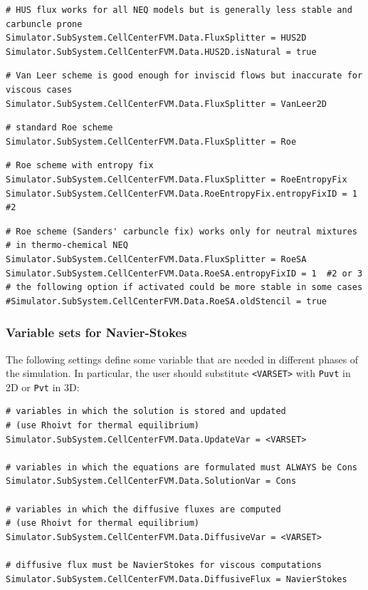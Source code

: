 \documentclass[11pt]{article}
\begin{document}
\begin{lstlisting}[breaklines]
# HUS flux works for all NEQ models but is generally less stable and carbuncle prone
Simulator.SubSystem.CellCenterFVM.Data.FluxSplitter = HUS2D
Simulator.SubSystem.CellCenterFVM.Data.HUS2D.isNatural = true
\end{lstlisting}

\begin{lstlisting}[breaklines]
# Van Leer scheme is good enough for inviscid flows but inaccurate for viscous cases
Simulator.SubSystem.CellCenterFVM.Data.FluxSplitter = VanLeer2D
\end{lstlisting}

\begin{lstlisting}[breaklines]
# standard Roe scheme
Simulator.SubSystem.CellCenterFVM.Data.FluxSplitter = Roe
\end{lstlisting}

\begin{lstlisting}[breaklines]
# Roe scheme with entropy fix
Simulator.SubSystem.CellCenterFVM.Data.FluxSplitter = RoeEntropyFix
Simulator.SubSystem.CellCenterFVM.Data.RoeEntropyFix.entropyFixID = 1 #2 
\end{lstlisting}

\begin{lstlisting}[breaklines]
# Roe scheme (Sanders' carbuncle fix) works only for neutral mixtures
# in thermo-chemical NEQ
Simulator.SubSystem.CellCenterFVM.Data.FluxSplitter = RoeSA 
Simulator.SubSystem.CellCenterFVM.Data.RoeSA.entropyFixID = 1  #2 or 3 
# the following option if activated could be more stable in some cases
#Simulator.SubSystem.CellCenterFVM.Data.RoeSA.oldStencil = true
\end{lstlisting}

\subsubsection{Variable sets for Navier-Stokes}

The following settings define some variable that are needed in different phases of the simulation.
In particular, the user should substitute {\tt <VARSET>} with {\tt Puvt} in 2D or {\tt Pvt} in 3D:

\begin{lstlisting}[breaklines]
# variables in which the solution is stored and updated 
# (use Rhoivt for thermal equilibrium)
Simulator.SubSystem.CellCenterFVM.Data.UpdateVar = <VARSET>

# variables in which the equations are formulated must ALWAYS be Cons
Simulator.SubSystem.CellCenterFVM.Data.SolutionVar = Cons

# variables in which the diffusive fluxes are computed 
# (use Rhoivt for thermal equilibrium)
Simulator.SubSystem.CellCenterFVM.Data.DiffusiveVar = <VARSET>

# diffusive flux must be NavierStokes for viscous computations
Simulator.SubSystem.CellCenterFVM.Data.DiffusiveFlux = NavierStokes
\end{lstlisting}
\end{document}
